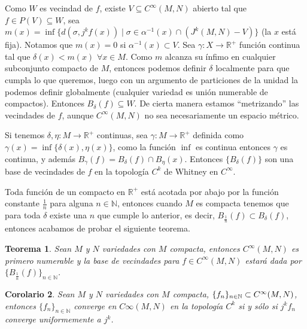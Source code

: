 \documentclass{report}
\newtheorem{theorem}{Teorema}[section]
\newtheorem{coro}[theorem]{Corolario}
\theoremstyle{definition}
\begin{document}
Como $W$ es vecindad de $f$, existe $V \subseteq C^\infty (M, N)$ abierto tal que $ f \in P(V) \subseteq W$, sea $m(x) = \inf \{ d (\sigma , j^k f(x)) \mid \sigma \in \alpha^{-1} (x) \cap (J^k (M,N) - V) \}$ (la $x$ est\'a fija). Notamos que $m(x) = 0$ si $\alpha^{-1} (x) \subset V$. Sea $\gamma: X \to \mathbb{R}^+$ funci\'on continua tal que $\delta (x) < m(x) $  $\forall x \in M$. Como $m$ alcanza su \'infimo en cualquier subconjunto compacto de $M$, entonces podemos definir $\delta$ localmente para que cumpla lo que queremos, luego con un argumento de particiones de la unidad la podemos definir globalmente (cualquier variedad es uni\'on numerable de compactos). Entonces $B_\delta (f) \subseteq W$. De cierta manera estamos ``metrizando'' las vecindades de $f$, aunque $C^\infty (M,N)$ no sea necesariamente  un espacio m\'etrico.

Si tenemos $\delta , \eta : M \to \mathbb{R}^+$ continuas, sea $\gamma: M \to \mathbb{R}^+$ definida como $\gamma (x) = \inf \{ \delta (x) , \eta (x) \}$, como la funci\'on $\inf$ es continua entonces $\gamma$ es continua, y adem\'as $B_\gamma (f) = B_\delta (f) \cap B_\eta (x)$. Entonces $ \{ B_\delta (f) \}$ son una base de vecindades de $f$ en la topolog\'ia $C^k$ de Whitney en $C^\infty$.

Toda funci\'on de un compacto en $\mathbb{R}^+$ est\'a acotada por abajo por la funci\'on constante $\frac{1}{n}$ para alguna $n\in \mathbb{N}$, entonces cuando $M$ es compacta tenemos que para toda $\delta$ existe una $n$ que cumple lo anterior, es decir, $B_{\frac{1}{n}} (f) \subset B_\delta (f)$, entonces acabamos de probar el siguiente teorema.

\begin{theorem}
Sean $M$ y $N$ variedades con $M$ compacta, entonces $C^\infty (M,N)$ es primero numerable y la base de vecindades para $f \in C^\infty(M,N)$ estar\'a dada por $ \{ B_{\frac{1}{n} } (f) \}_{n \in \mathbb{N}} $.
\end{theorem}

\begin{coro}
Sean $M$ y $N$ variedades con $M$ compacta, $\{ f_n \}_{n \in \mathbb{N}} \subset \\ C^\infty (M,N)$, entonces $\{ f_n \}_{n \in \mathbb{N}} $ converge en $C\infty(M,N)$ en la topolog\'ia $C^k$ si y s\'olo si $j^k f_n$ converge uniformemente a $j^k$.

\end{coro}
\end{document}
